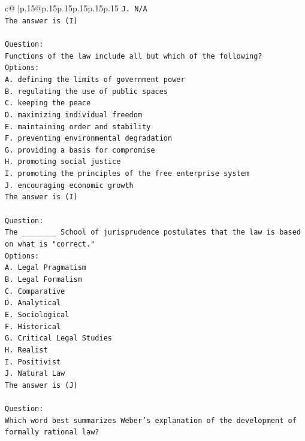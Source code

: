 \documentclass{article}
\begin{document}
{\begin{supertabular}{c@{$\;$}|p{.15\linewidth}@{}p{.15\linewidth}p{.15\linewidth}p{.15\linewidth}p{.15\linewidth}p{.15\linewidth}}
{{{\texttt{J. N/A} \\
\texttt{The answer is (I)} \\
\\ 
\texttt{Question:} \\
\texttt{Functions of the law include all but which of the following?} \\
\texttt{Options:} \\
\texttt{A. defining the limits of government power} \\
\texttt{B. regulating the use of public spaces} \\
\texttt{C. keeping the peace} \\
\texttt{D. maximizing individual freedom} \\
\texttt{E. maintaining order and stability} \\
\texttt{F. preventing environmental degradation} \\
\texttt{G. providing a basis for compromise} \\
\texttt{H. promoting social justice} \\
\texttt{I. promoting the principles of the free enterprise system} \\
\texttt{J. encouraging economic growth} \\
\texttt{The answer is (I)} \\
\\ 
\texttt{Question:} \\
\texttt{The \_\_\_\_\_\_\_\_ School of jurisprudence postulates that the law is based on what is "correct."} \\
\texttt{Options:} \\
\texttt{A. Legal Pragmatism} \\
\texttt{B. Legal Formalism} \\
\texttt{C. Comparative} \\
\texttt{D. Analytical} \\
\texttt{E. Sociological} \\
\texttt{F. Historical} \\
\texttt{G. Critical Legal Studies} \\
\texttt{H. Realist} \\
\texttt{I. Positivist} \\
\texttt{J. Natural Law} \\
\texttt{The answer is (J)} \\
\\ 
\texttt{Question:} \\
\texttt{Which word best summarizes Weber's explanation of the development of formally rational law?} \\
}}}
\end{supertabular}}
\end{document}
